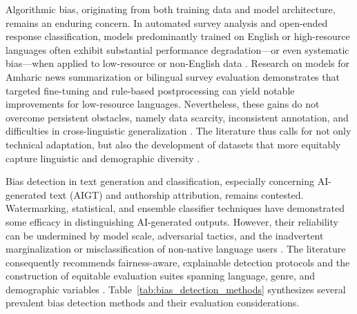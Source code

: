 Algorithmic bias, originating from both training data and model architecture, remains an enduring concern. In automated survey analysis and open-ended response classification, models predominantly trained on English or high-resource languages often exhibit substantial performance degradation—or even systematic bias—when applied to low-resource or non-English data \cite{ref2}\cite{ref9}\cite{ref13}\cite{ref39}\cite{ref64}\cite{ref65}\cite{ref70}\cite{ref81}\cite{ref83}\cite{ref95}\cite{ref97}\cite{ref98}. Research on models for Amharic news summarization or bilingual survey evaluation demonstrates that targeted fine-tuning and rule-based postprocessing can yield notable improvements for low-resource languages. Nevertheless, these gains do not overcome persistent obstacles, namely data scarcity, inconsistent annotation, and difficulties in cross-linguistic generalization \cite{ref13}\cite{ref81}\cite{ref97}\cite{ref98}. The literature thus calls for not only technical adaptation, but also the development of datasets that more equitably capture linguistic and demographic diversity \cite{ref39}\cite{ref82}\cite{ref83}\cite{ref97}\cite{ref98}. 

Bias detection in text generation and classification, especially concerning AI-generated text (AIGT) and authorship attribution, remains contested. Watermarking, statistical, and ensemble classifier techniques have demonstrated some efficacy in distinguishing AI-generated outputs. However, their reliability can be undermined by model scale, adversarial tactics, and the inadvertent marginalization or misclassification of non-native language users \cite{ref15}\cite{ref40}\cite{ref41}\cite{ref66}\cite{ref90}\cite{ref93}\cite{ref96}. The literature consequently recommends fairness-aware, explainable detection protocols and the construction of equitable evaluation suites spanning language, genre, and demographic variables \cite{ref40}\cite{ref70}\cite{ref90}\cite{ref91}\cite{ref97}\cite{ref98}. Table~\ref{tab:bias_detection_methods} synthesizes several prevalent bias detection methods and their evaluation considerations.

